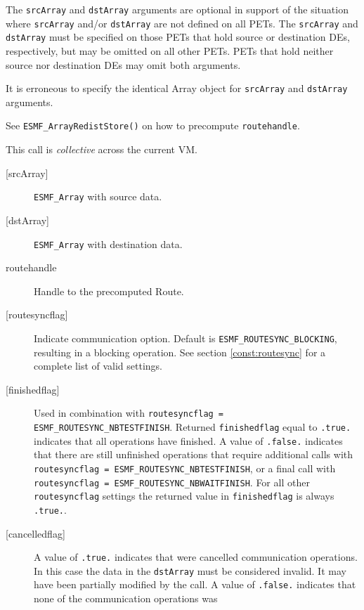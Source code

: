      The {\tt srcArray} and {\tt dstArray} arguments are optional in support of
     the situation where {\tt srcArray} and/or {\tt dstArray} are not defined on
     all PETs. The {\tt srcArray} and {\tt dstArray} must be specified on those
     PETs that hold source or destination DEs, respectively, but may be omitted
     on all other PETs. PETs that hold neither source nor destination DEs may
     omit both arguments.
  
     It is erroneous to specify the identical Array object for {\tt srcArray} and
     {\tt dstArray} arguments.
  
     See {\tt ESMF\_ArrayRedistStore()} on how to precompute 
     {\tt routehandle}.
  
     This call is {\em collective} across the current VM.
  
     \begin{description}
     \item [{[srcArray]}]
       {\tt ESMF\_Array} with source data.
     \item [{[dstArray]}]
       {\tt ESMF\_Array} with destination data.
     \item [routehandle]
       Handle to the precomputed Route.
     \item [{[routesyncflag]}]
       Indicate communication option. Default is {\tt ESMF\_ROUTESYNC\_BLOCKING},
       resulting in a blocking operation.
       See section \ref{const:routesync} for a complete list of valid settings.
     \item [{[finishedflag]}]
       \begin{sloppypar}
       Used in combination with {\tt routesyncflag = ESMF\_ROUTESYNC\_NBTESTFINISH}.
       Returned {\tt finishedflag} equal to {\tt .true.} indicates that all
       operations have finished. A value of {\tt .false.} indicates that there
       are still unfinished operations that require additional calls with
       {\tt routesyncflag = ESMF\_ROUTESYNC\_NBTESTFINISH}, or a final call with
       {\tt routesyncflag = ESMF\_ROUTESYNC\_NBWAITFINISH}. For all other {\tt routesyncflag}
       settings the returned value in {\tt finishedflag} is always {\tt .true.}.
       \end{sloppypar}
     \item [{[cancelledflag]}]
       A value of {\tt .true.} indicates that were cancelled communication
       operations. In this case the data in the {\tt dstArray} must be considered
       invalid. It may have been partially modified by the call. A value of
       {\tt .false.} indicates that none of the communication operations was

\end{description}
